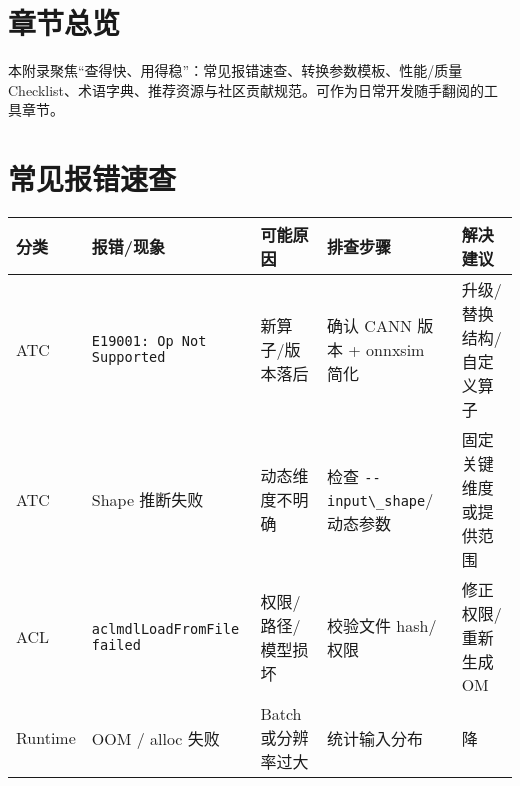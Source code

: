 \section{章节总览}\label{ux7ae0ux8282ux603bux89c8}

本附录聚焦``查得快、用得稳''：常见报错速查、转换参数模板、性能/质量
Checklist、术语字典、推荐资源与社区贡献规范。可作为日常开发随手翻阅的工具章节。

\section{常见报错速查}\label{ux5e38ux89c1ux62a5ux9519ux901fux67e5}

\begin{longtable}[]{@{}
  >{\raggedright\arraybackslash}p{}
  >{\raggedright\arraybackslash}p{}
  >{\raggedright\arraybackslash}p{}
  >{\raggedright\arraybackslash}p{}
  >{\raggedright\arraybackslash}p{}@{}}
\toprule\noalign{}
\begin{minipage}[b]{\linewidth}\raggedright
分类
\end{minipage} & \begin{minipage}[b]{\linewidth}\raggedright
报错/现象
\end{minipage} & \begin{minipage}[b]{\linewidth}\raggedright
可能原因
\end{minipage} & \begin{minipage}[b]{\linewidth}\raggedright
排查步骤
\end{minipage} & \begin{minipage}[b]{\linewidth}\raggedright
解决建议
\end{minipage} \\
\midrule\noalign{}
\endhead
\bottomrule\noalign{}
\endlastfoot
ATC & \passthrough{\lstinline!E19001: Op Not Supported!} &
新算子/版本落后 & 确认 CANN 版本 + onnxsim 简化 &
升级/替换结构/自定义算子 \\
ATC & Shape 推断失败 & 动态维度不明确 & 检查
\passthrough{\lstinline!--input\_shape!}/动态参数 &
固定关键维度或提供范围 \\
ACL & \passthrough{\lstinline!aclmdlLoadFromFile failed!} &
权限/路径/模型损坏 & 校验文件 hash/权限 & 修正权限/重新生成 OM \\
Runtime & OOM / alloc 失败 & Batch 或分辨率过大 & 统计输入分布 & 降

\end{longtable}
